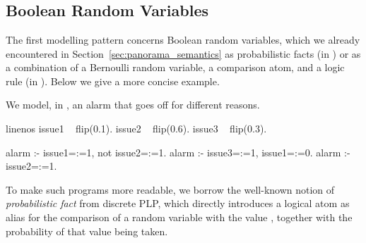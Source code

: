 \section{\dcproblogsty} \label{sec:dcproblog}



\subsection{Boolean Random Variables}

The first modelling pattern concerns Boolean random variables, which we already encountered in Section~\ref{sec:panorama_semantics} as probabilistic facts (in \dcproblogsty) or as a combination of a Bernoulli random variable, a comparison atom, and a logic rule (in \dfplpsty). Below we give a more concise example.

\begin{example}
    We model, in \dfplpsty, an alarm that goes off for different reasons.
    \begin{problog*}{linenos}
issue1 ~ flip(0.1).
issue2 ~ flip(0.6).
issue3 ~ flip(0.3).

alarm :- issue1=:=1, not issue2=:=1.
alarm :- issue3=:=1, issue1=:=0.
alarm :- issue2=:=1.
    \end{problog*}
\end{example}
To make such programs more readable, we borrow the well-known notion of \emph{probabilistic fact} from discrete PLP, which directly introduces a logical atom as alias for the comparison of a random variable with the value , together with the probability of that value being taken.

